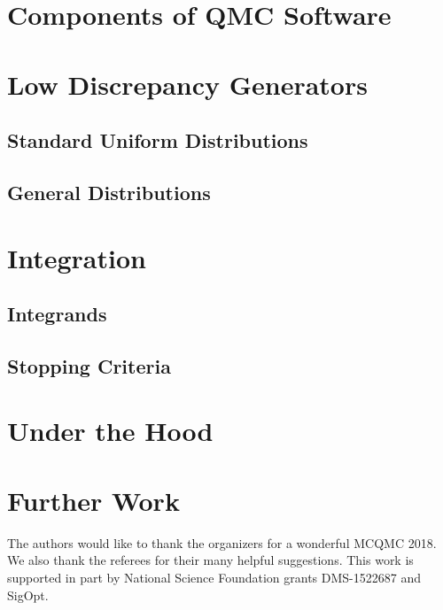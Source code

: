 \documentclass[graybox,footinfo]{svmult}
\begin{document}
\section{Components of QMC Software}

\section{Low Discrepancy Generators}

\subsection{Standard Uniform Distributions}

\subsection{General Distributions}

\section{Integration}

\subsection{Integrands}

\subsection{Stopping Criteria}

\section{Under the Hood}



\section{Further Work} \label{sec:further}


\begin{acknowledgement}
The authors would like to thank the organizers for a wonderful MCQMC 2018. 
We also thank the referees for their many helpful suggestions.  This work is supported in part by National Science Foundation grants DMS-1522687 and SigOpt.


\end{acknowledgement}



\end{document}
